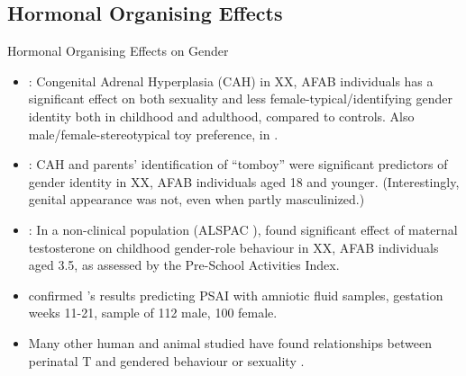 \documentclass[hyperref={pdfpagelabels=false}]{beamer}
\begin{document}


\subsection{Hormonal Organising Effects}

\begin{frame}{Hormonal Organising Effects on Gender}
\begin{itemize}
	\item \citet{hinesetal2004}: Congenital Adrenal Hyperplasia (CAH) in XX, AFAB individuals has a significant effect on both sexuality and less female-typical/identifying gender identity both in childhood and adulthood, compared to controls. Also male/female-stereotypical toy preference, in \citet{pasterskietal2005}.
	\item \citet{berenbaumbailey2003}: CAH and parents' identification of ``tomboy'' were significant predictors of gender identity in XX, AFAB individuals aged 18 and younger. (Interestingly, genital appearance was not, even when partly masculinized.)
	\item \citet{hinesetal2002}: In a non-clinical population (ALSPAC \citealt{alspac2001}), found significant effect of maternal testosterone on childhood gender-role behaviour in XX, AFAB individuals aged 3.5, as assessed by the Pre-School Activities Index.
	\item \citet{auyeungetal2009} confirmed \citet{hinesetal2002}'s results predicting PSAI with amniotic fluid samples, gestation weeks 11-21, sample of 112 male, 100 female.
	\item Many other human and animal studied have found relationships between perinatal T and gendered behaviour or sexuality \citep[see][for reviews]{cohenbendahanetal2005, hines2006, balthazart2011, hinesetal2015}.
\end{itemize}
\end{frame}
\end{document}
